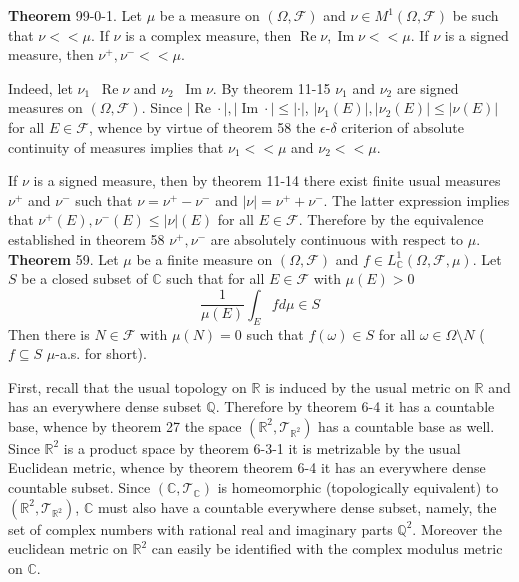 \documentclass[a4paper]{article}
\newcommand{\brac}[1]{\left ( #1 \right )}
\newcommand{\abs}[1]{\left | #1 \right |}
\newcommand{\Real}{\mathbb{R}}
\newcommand{\Cplx}{\mathbb{C}}
\newcommand{\Tcal}{\mathcal{T}}
\newcommand{\Fcal}{\mathcal{F}}
\newcommand{\defn}{\mathop{\overset{\Delta}{=}}\nolimits}
\newcommand{\re}{\operatorname{Re}\nolimits}
\newcommand{\im}{\operatorname{Im}\nolimits}
\begin{document}
\label{thm:muas_confinement} \noindent \textbf{Theorem} 99-0-1.
Let $\mu$ be a measure on $\brac{\Omega, \Fcal}$ and $\nu\in M^1\brac{\Omega, \Fcal}$ be such that $\nu<<\mu$. If $\nu$ is a complex measure, then $\re \nu, \im \nu << \mu$. If $\nu$ is a signed measure, then $\nu^+, \nu^- << \mu$.

Indeed, let $\nu_1\defn \re \nu$ and $\nu_2\defn \im \nu$. By theorem 11-15 $\nu_1$ and $\nu_2$ are signed measures on $\brac{\Omega, \Fcal}$. Since $\abs{\re \cdot}, \abs{\im \cdot}\leq \abs{\cdot}$, $\abs{\nu_1\brac{E}},\abs{\nu_2\brac{E}}\leq \abs{\nu\brac{E}}$ for all $E\in \Fcal$, whence by virtue of theorem 58 the $\epsilon$-$\delta$ criterion of absolute continuity of measures implies that $\nu_1<<\mu$ and $\nu_2<<\mu$.

If $\nu$ is a signed measure, then by theorem 11-14 there exist finite usual measures $\nu^+$ and $\nu^-$ such that $\nu=\nu^+-\nu^-$ and $\abs{\nu}=\nu^++\nu^-$. The latter expression implies that $\nu^+\brac{E}, \nu^-\brac{E}\leq \abs{\nu}\brac{E}$ for all $E\in \Fcal$. Therefore by the equivalence established in theorem 58 $\nu^+, \nu^-$ are absolutely continuous with respect to $\mu$.\\

\label{thm:muas_confinement2} \noindent \textbf{Theorem} 59.
Let $\mu$ be a finite measure on $\brac{\Omega, \Fcal}$ and $f\in L^1_\Cplx\brac{\Omega, \Fcal, \mu}$. Let $S$ be a closed subset of $\Cplx$ such that for all $E\in \Fcal$ with $\mu\brac{E}>0$ \[\frac{1}{\mu\brac{E}} \int_E f d\mu \in S \] Then there is $N\in \Fcal$ with $\mu\brac{N}=0$ such that $f\brac{\omega}\in S$ for all $\omega\in \Omega\setminus N$ ($f\subseteq S$ $\mu$-a.s. for short).

First, recall that the usual topology on $\Real$ is induced by the usual metric on $\Real$ and has an everywhere dense subset $\mathbb{Q}$. Therefore by theorem 6-4 it has a countable base, whence by theorem 27 the space $\brac{\Real^2, \Tcal_{\Real^2}}$ has a countable base as well. Since $\Real^2$ is a product space by theorem 6-3-1 it is metrizable by the usual Euclidean metric, whence by theorem theorem 6-4 it has an everywhere dense countable subset. Since $\brac{\Cplx,\Tcal_\Cplx}$ is homeomorphic (topologically equivalent) to $\brac{\Real^2, \Tcal_{\Real^2}}$, $\Cplx$ must also have a countable everywhere dense subset, namely, the set of complex numbers with rational real and imaginary parts $\mathbb{Q}^2$. Moreover the euclidean metric on $\Real^2$ can easily be identified with the complex modulus metric on $\Cplx$.
\end{document}
